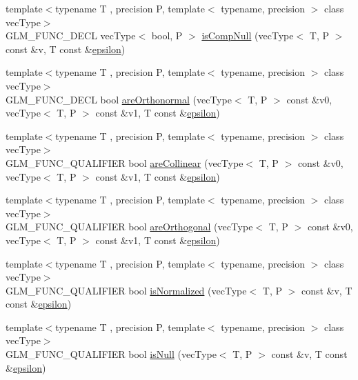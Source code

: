 \begin{DoxyCompactItemize}
\item 
{\footnotesize template$<$typename T , precision P, template$<$ typename, precision $>$ class vec\+Type$>$ }\\G\+L\+M\+\_\+\+F\+U\+N\+C\+\_\+\+D\+E\+CL vec\+Type$<$ bool, P $>$ \hyperlink{group__gtx__vector__query_ga93ecd4137480483ce1af0de8bbbf6546}{is\+Comp\+Null} (vec\+Type$<$ T, P $>$ const \&v, T const \&\hyperlink{group__gtc__constants_gacb41049b8d22c8aa90e362b96c524feb}{epsilon})
\item 
{\footnotesize template$<$typename T , precision P, template$<$ typename, precision $>$ class vec\+Type$>$ }\\G\+L\+M\+\_\+\+F\+U\+N\+C\+\_\+\+D\+E\+CL bool \hyperlink{group__gtx__vector__query_ga89c82bc60e5b84e4489b74c15a134caf}{are\+Orthonormal} (vec\+Type$<$ T, P $>$ const \&v0, vec\+Type$<$ T, P $>$ const \&v1, T const \&\hyperlink{group__gtc__constants_gacb41049b8d22c8aa90e362b96c524feb}{epsilon})
\item 
{\footnotesize template$<$typename T , precision P, template$<$ typename, precision $>$ class vec\+Type$>$ }\\G\+L\+M\+\_\+\+F\+U\+N\+C\+\_\+\+Q\+U\+A\+L\+I\+F\+I\+ER bool \hyperlink{group__gtx__vector__query_ga465b844190d1740051e45d780832ea4c}{are\+Collinear} (vec\+Type$<$ T, P $>$ const \&v0, vec\+Type$<$ T, P $>$ const \&v1, T const \&\hyperlink{group__gtc__constants_gacb41049b8d22c8aa90e362b96c524feb}{epsilon})
\item 
{\footnotesize template$<$typename T , precision P, template$<$ typename, precision $>$ class vec\+Type$>$ }\\G\+L\+M\+\_\+\+F\+U\+N\+C\+\_\+\+Q\+U\+A\+L\+I\+F\+I\+ER bool \hyperlink{group__gtx__vector__query_gaee10acefed397c11e01f2862e837754c}{are\+Orthogonal} (vec\+Type$<$ T, P $>$ const \&v0, vec\+Type$<$ T, P $>$ const \&v1, T const \&\hyperlink{group__gtc__constants_gacb41049b8d22c8aa90e362b96c524feb}{epsilon})
\item 
{\footnotesize template$<$typename T , precision P, template$<$ typename, precision $>$ class vec\+Type$>$ }\\G\+L\+M\+\_\+\+F\+U\+N\+C\+\_\+\+Q\+U\+A\+L\+I\+F\+I\+ER bool \hyperlink{group__gtx__vector__query_ga6fa5fa2af67d14c205d24c49aad03270}{is\+Normalized} (vec\+Type$<$ T, P $>$ const \&v, T const \&\hyperlink{group__gtc__constants_gacb41049b8d22c8aa90e362b96c524feb}{epsilon})
\item 
{\footnotesize template$<$typename T , precision P, template$<$ typename, precision $>$ class vec\+Type$>$ }\\G\+L\+M\+\_\+\+F\+U\+N\+C\+\_\+\+Q\+U\+A\+L\+I\+F\+I\+ER bool \hyperlink{group__gtx__vector__query_ga81a64edc1a2b470b82896592e89c523b}{is\+Null} (vec\+Type$<$ T, P $>$ const \&v, T const \&\hyperlink{group__gtc__constants_gacb41049b8d22c8aa90e362b96c524feb}{epsilon})

\end{DoxyCompactItemize}

